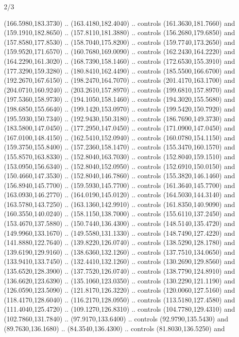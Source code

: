 \begin{flagdescription}{2/3}
\begin{scope}[shift={(0.5\flaglength,0.5)},scale=\flagwidth/480]
\begin{scope}[y=0.8pt, x=0.80pt, yscale=-1,shift={(-450,-300)}]
\begin{scope}[cm={{1.02948,0.0,0.0,1.02948,(-13.26599,6.99414)}}]
\begin{scope}[shift={(341.0917,90.34325)}]
  (166.5980,183.3730) .. (163.4180,182.4040) .. controls (161.3630,181.7660) and
  (159.1910,182.8650) .. (157.8110,181.3880) .. controls (156.2680,179.6850) and
  (157.8580,177.8530) .. (158.7040,175.8200) .. controls (159.7740,173.2650) and
  (159.9520,171.6570) .. (160.7680,169.0090) .. controls (162.2430,164.2220) and
  (164.2290,161.3020) .. (168.7390,158.1460) .. controls (172.6530,155.3910) and
  (177.3290,159.3280) .. (180.8410,162.4490) .. controls (185.5500,166.6700) and
  (192.2670,167.6150) .. (198.2470,164.7070) .. controls (201.4170,163.1700) and
  (204.0710,160.9240) .. (203.2610,157.8970) .. controls (199.6810,157.8970) and
  (197.5360,158.9730) .. (194.1050,158.1460) .. controls (194.3020,155.5680) and
  (198.6850,155.6640) .. (199.1420,153.0970) .. controls (199.5420,150.7920) and
  (195.5930,150.7340) .. (192.9430,150.3180) .. controls (186.7690,149.3730) and
  (183.5800,147.0450) .. (177.2950,147.0450) .. controls (171.0900,147.0450) and
  (167.0100,148.4150) .. (162.5410,152.0940) .. controls (160.0780,154.1150) and
  (159.3750,155.8400) .. (157.2360,158.1470) .. controls (155.3470,160.1570) and
  (155.8570,163.8330) .. (152.8040,163.7030) .. controls (152.8040,159.1510) and
  (153.0950,156.6340) .. (152.8040,152.0950) .. controls (152.6910,150.0150) and
  (150.4660,147.3530) .. (152.8040,146.7860) .. controls (155.3820,146.1460) and
  (156.8940,145.7700) .. (159.5930,145.7700) .. controls (161.3640,145.7700) and
  (163.0930,146.2770) .. (164.0190,145.0120) .. controls (164.5030,144.3140) and
  (163.5780,143.7250) .. (163.1360,142.9910) .. controls (161.8350,140.9090) and
  (160.3550,140.0240) .. (158.1150,138.7000) .. controls (155.6110,137.2450) and
  (153.4670,137.5880) .. (150.7440,136.4300) .. controls (148.5140,135.4720) and
  (149.9960,133.1670) .. (149.5580,131.1330) .. controls (148.7490,127.4220) and
  (141.8880,122.7640) .. (139.8220,126.0740) .. controls (138.5290,128.1780) and
  (139.6190,129.9160) .. (138.6360,132.1260) .. controls (137.7510,134.0650) and
  (133.9410,133.7450) .. (132.4410,132.1260) .. controls (130.2690,129.8560) and
  (135.6520,128.3900) .. (137.7520,126.0740) .. controls (138.7790,124.8910) and
  (136.6620,123.6390) .. (135.1060,123.0350) .. controls (130.2290,121.1190) and
  (126.0590,123.5090) .. (121.8170,126.3220) .. controls (120.0060,127.5160) and
  (118.4170,128.6040) .. (116.2170,128.0950) .. controls (113.5180,127.4580) and
  (111.4040,125.4720) .. (109.1270,126.8310) .. controls (104.7780,129.4310) and
  (102.7860,131.7840) .. (97.9170,133.6400) .. controls (92.9790,135.5430) and
  (89.7630,136.1680) .. (84.3540,136.4300) .. controls (81.8030,136.5250) and

\end{scope}
\end{scope}
\end{scope}
\end{scope}
\end{flagdescription}

